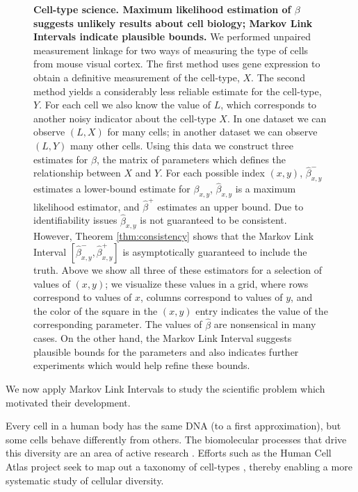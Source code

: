 \documentclass{article}
\theoremstyle{definition}
\begin{document}
\begin{figure}
{\begin{minipage}{\textwidth}
\hfill{}\begin{minipage}{.9\textwidth}
\caption{\textbf{Cell-type science.  Maximum likelihood estimation of $\beta$ suggests unlikely results about cell biology; Markov Link Intervals indicate plausible bounds.}  \label{fig:allen}
%
We performed unpaired measurement linkage for two ways of measuring the type of cells from mouse visual cortex.  The first method uses gene expression to obtain a definitive measurement of the cell-type, $X$.  The second method yields a considerably less reliable estimate for the cell-type, $Y$.  For each cell we also know the value of $L$, which corresponds to another noisy indicator about the cell-type $X$.  In one dataset we can observe $(L,X)$ for many cells; in another dataset we can observe $(L,Y)$ many other cells.  Using this data we construct three estimates for $\beta$, the matrix of parameters which defines the relationship between $X$ and $Y$.  For each possible index $(x,y)$, $\hat \beta^{-}_{x,y}$ estimates a lower-bound estimate for $\beta_{x,y}$, $\hat \beta_{x,y}$ is a maximum likelihood estimator, and $\hat \beta^{+}$ estimates an upper bound.  Due to identifiability issues $\hat \beta_{x,y}$ is not guaranteed to be consistent.  However, Theorem \ref{thm:consistency} shows that the Markov Link Interval $[\hat \beta^{-}_{x,y},\hat \beta^{+}_{x,y}]$ is asymptotically guaranteed to include the truth.  Above we show all three of these estimators for a selection of values of $(x,y)$; we visualize these values in a grid, where rows correspond to values of $x$, columns correspond to values of $y$, and the color of the square in the $(x,y)$ entry indicates the value of the corresponding parameter.  The values of $\hat \beta$ are nonsensical in many cases.  On the other hand, the Markov Link Interval suggests plausible bounds for the parameters and also indicates further experiments which would help refine these bounds.
}
\end{minipage}\hfill{}
\end{minipage}}\end{figure}

We now apply Markov Link Intervals to study the scientific problem which motivated their development.  

Every cell in a human body has the same DNA (to a first approximation), but some cells behave differently from others.  The biomolecular processes that drive this diversity are an area of active research \cite{wagner2018single,boudreau2018cell,he2018mechanical}.  Efforts such as the Human Cell Atlas project seek to map out a taxonomy of cell-types \cite{rozenblatt2017human}, thereby enabling a more systematic study of cellular diversity.  
\end{document}
